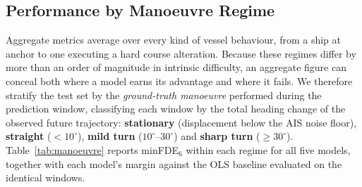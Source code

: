 \documentclass[12pt, a4paper]{article}
\begin{document}
  \subsection{Performance by Manoeuvre Regime}
  \label{sec:manoeuvre}

  Aggregate metrics average over every kind of vessel behaviour, from a ship at
  anchor to one executing a hard course alteration.  Because these regimes differ
  by more than an order of magnitude in intrinsic difficulty, an aggregate figure
  can conceal both where a model earns its advantage and where it fails.  We
  therefore stratify the test set by the \emph{ground-truth manoeuvre} performed
  during the prediction window, classifying each window by the total heading
  change of the observed future trajectory: \textbf{stationary} (displacement
  below the AIS noise floor), \textbf{straight} ($<10^{\circ}$),
  \textbf{mild turn} ($10^{\circ}$--$30^{\circ}$) and \textbf{sharp turn}
  ($\geq 30^{\circ}$).  Table~\ref{tab:manoeuvre} reports minFDE$_6$ within each
  regime for all five models, together with each model's margin against the OLS
  baseline evaluated on the identical windows.

  \begin{table}[H]
    \centering
    \small
    \caption{Test-set minFDE$_6$ (m) by ground-truth manoeuvre regime, with each
             model's margin against the OLS baseline on the same windows
             ($\Delta$; negative = better than constant-velocity extrapolation).
             Bucket shares are of the 11{,}891 test windows.}
    \label{tab:manoeuvre}
  \end{table}
\end{document}
